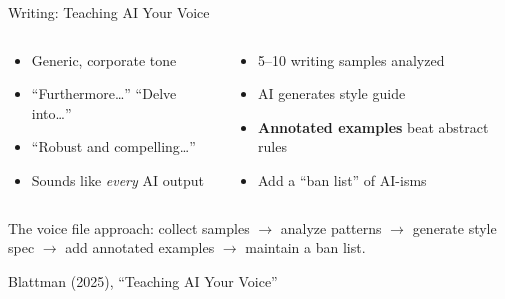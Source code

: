 \documentclass[aspectratio=169, 11pt]{beamer}
\newcommand{\emphgold}[1]{\alert{\textbf{#1}}}
\newcommand{\sourceref}[1]{\vspace{0.15cm}\hfill{\tiny\textcolor{medgray}{#1}}}
\begin{document}
\begin{frame}[shrink=5]{Writing: Teaching AI Your Voice}
\begin{columns}[T]
\begin{warningbox}
\begin{itemize}
  \item Generic, corporate tone
  \item ``Furthermore\ldots'' ``Delve into\ldots''
  \item ``Robust and compelling\ldots''
  \item Sounds like \emph{every} AI output
\end{itemize}
\end{warningbox}

\begin{keyinsight}
\begin{itemize}
  \item 5--10 writing samples analyzed
  \item AI generates style guide
  \item \emphgold{Annotated examples} beat abstract rules
  \item Add a ``ban list'' of AI-isms
\end{itemize}
\end{keyinsight}
\end{columns}
\vspace{0.5cm}
\begin{bigquote}
\small
The voice file approach: collect samples $\rightarrow$ analyze patterns $\rightarrow$ generate style spec $\rightarrow$ add annotated examples $\rightarrow$ maintain a ban list.
\end{bigquote}
\sourceref{Blattman (2025), ``Teaching AI Your Voice''}
\end{frame}
\end{document}
